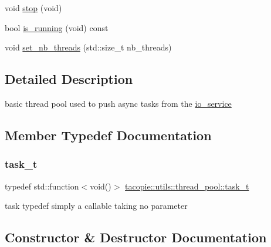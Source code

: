 \begin{DoxyCompactItemize}
\item 
void \hyperlink{classtacopie_1_1utils_1_1thread__pool_a8874d7040d12fbe446519bc9f2bcff37}{stop} (void)
\item 
bool \hyperlink{classtacopie_1_1utils_1_1thread__pool_a77a647a75be188a5c5f83b922c061107}{is\+\_\+running} (void) const
\item 
void \hyperlink{classtacopie_1_1utils_1_1thread__pool_a7c7ae922cedff8fa323828ebb6dea829}{set\+\_\+nb\+\_\+threads} (std\+::size\+\_\+t nb\+\_\+threads)
\end{DoxyCompactItemize}


\subsection{Detailed Description}
basic thread pool used to push async tasks from the \hyperlink{classtacopie_1_1io__service}{io\+\_\+service} 

\subsection{Member Typedef Documentation}
\mbox{\label{classtacopie_1_1utils_1_1thread__pool_a8ae8886fdeaa8e5c0abad12626a47296}} 
\subsubsection{\texorpdfstring{task\+\_\+t}{task\_t}}
{\footnotesize\ttfamily typedef std\+::function$<$void()$>$ \hyperlink{classtacopie_1_1utils_1_1thread__pool_a8ae8886fdeaa8e5c0abad12626a47296}{tacopie\+::utils\+::thread\+\_\+pool\+::task\+\_\+t}}

task typedef simply a callable taking no parameter 

\subsection{Constructor \& Destructor Documentation}
\mbox{\label{classtacopie_1_1utils_1_1thread__pool_aa0068f000b8ecb21b2b0a0c50f77877c}} 
